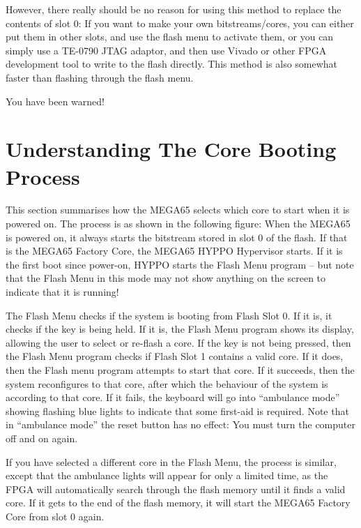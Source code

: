 However, there really should be no reason for using this method to replace the contents of slot 0:
If you want to make your own bitstreams/cores, you can either put them in other slots, and use the
flash menu to activate them, or you can simply use a TE-0790 JTAG adaptor, and then use
Vivado or other FPGA development tool to write to the flash directly. This method is also
somewhat faster than flashing through the flash menu.

You have been warned!

\section{Understanding The Core Booting Process}

This section summarises how the MEGA65 selects which core to start when it is powered on.
The process is as shown in the following figure: When the MEGA65 is
powered on, it always starts the bitstream stored in slot 0 of the
flash.  If that is the MEGA65 Factory Core, the MEGA65 HYPPO
Hypervisor starts.  If it is the first boot since power-on, HYPPO
starts the Flash Menu program -- but note that the Flash Menu in
this mode may not show anything on the screen to indicate that it is
running!

The Flash Menu checks if the system is booting from Flash
Slot 0.  If it is, it checks if the  key is being held.  If
it is, the Flash Menu program shows its display, allowing the user
to select or re-flash a core. If the  key is not being
pressed, then the Flash Menu program checks if Flash Slot 1 contains a valid
core.  If it does, then the Flash menu program attempts to start
that core.  If it succeeds, then the system reconfigures to that core,
after which the behaviour of the system is according to that core. If
it fails, the keyboard will go into ``ambulance mode'' showing flashing blue
lights to indicate that some first-aid is required.  Note that in ``ambulance
mode'' the reset button has no effect: You must turn the computer off
and on again.

If you have selected a different core in the Flash Menu, the process
is similar, except that the ambulance lights will appear for only a
limited time, as the FPGA will automatically search through the flash
memory until it finds a valid core. If it gets to the end of the flash
memory, it will start the MEGA65 Factory Core from slot 0 again.

